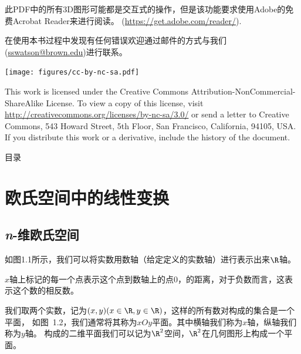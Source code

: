 \documentclass[indent]{watsonbook}
\begin{document}
此PDF中的所有3D图形可能都是交互式的操作，但是该功能要求使用Adobe的免费Acrobat Reader来进行阅读。
(\href{https://get.adobe.com/reader/}{\url{https://get.adobe.com/reader/}}).

在使用本书过程中发现有任何错误欢迎通过邮件的方式与我们(\url{sswatson@brown.edu})进行联系。


\newpage


\null\vfill

\texttt{[image: figures/cc-by-nc-sa.pdf]} \\
{\small
  This work is licensed under the Creative Commons
  Attribution-NonCommercial-ShareAlike License. To view a copy of this
  license, visit
  \url{http://creativecommons.org/licenses/by-nc-sa/3.0/}
  or
  send a letter to Creative Commons, 543 Howard Street, 5th Floor, San
  Francisco, California, 94105, USA. If you distribute this work or a
  derivative, include the history of the document.

%
%

\thispagestyle{empty}
\begin{Mybox}{目\quad 录}
\makeatletter
\makeatother
\end{Mybox}
\thispagestyle{empty}
\clearpage
%

\chapter{欧氏空间中的线性变换}
%
\section{\textit{n}-维欧氏空间} \label{sec:ndimspace}

\begin{minipage}{0.6\linewidth}

如图1.1所示，我们可以将实数用数轴（给定定义的实数轴）进行表示出来$\R$轴。


$x$轴上标记的每一个点表示这个点到数轴上的点0，的距离，对于负数而言，这表示这个数的相反数。

我们取两个实数，记为$(x,y)(x\in \R,y\in \R)$，这样的所有数对构成的集合是一个平面，
如图~1.2，我们通常将其称为$xOy$平面。其中横轴我们称为$x$轴，纵轴我们称为$y$轴。
构成的二维平面我们可以记为$\R^2$空间，$\R^2$在几何图形上构成一个平面。


\end{minipage}}
\end{document}
